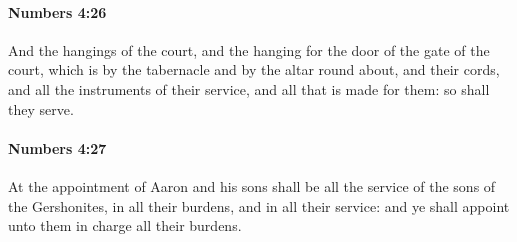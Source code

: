 		\paragraph{Numbers 4:26} %
			\label{NUMBERS-4-26}

			And the hangings of the court, and the hanging for the door of the gate of the court, which is by the tabernacle and by the altar round about, and their cords, and all the instruments of their service, and all that is made for them: so shall they serve.


		\paragraph{Numbers 4:27} %
			\label{NUMBERS-4-27}

			At the appointment of Aaron and his sons shall be all the service of the sons of the Gershonites, in all their burdens, and in all their service: and ye shall appoint unto them in charge all their burdens.

